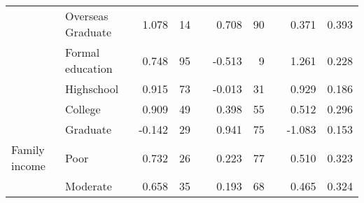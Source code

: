 \begin{table}[h!]
{\begin{threeparttable}
\begin{tabular}{llrrlrrlrl}
	& Overseas Graduate                                                    & 1.078                        & 14                    &  & 0.708                        & 90                    &  & 0.371                                           & 0.393                                                                                               \\
	& Formal education                                                     & 0.748                        & 95                    &  & -0.513                       & 9                     &  & 1.261                                           & 0.228                                                                                               \\
	& Highschool                                                           & 0.915                        & 73                    &  & -0.013                       & 31                    &  & 0.929                                           & 0.186                                                                                               \\
	& College                                                              & 0.909                        & 49                    &  & 0.398                        & 55                    &  & 0.512                                           & 0.296                                                                                               \\
	& Graduate                                                             & -0.142                       & 29                    &  & 0.941                        & 75                    &  & -1.083                                          & 0.153                                                                                               \\ \hline
	Family income                                                                      & Poor                                                                 & 0.732                        & 26                    &  & 0.223                        & 77                    &  & 0.510                                           & 0.323                                                                                               \\
	& Moderate                                                             & 0.658                        & 35                    &  & 0.193                        & 68                    &  & 0.465                                           & 0.324                                                                                               \\

\end{tabular}
\end{threeparttable}}
\end{table}
